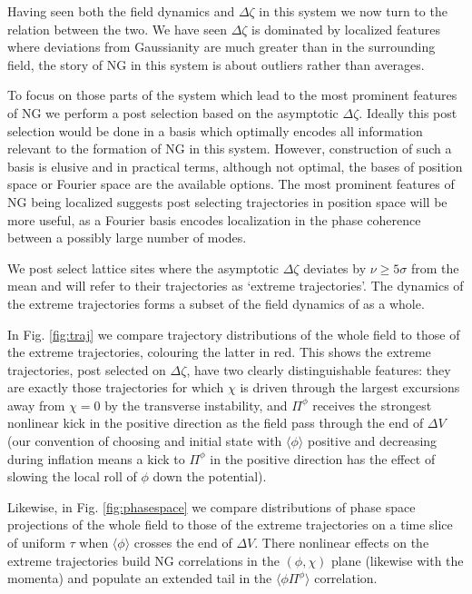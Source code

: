 Having seen both the field dynamics and $\Delta\zeta$ in this system we now turn to the relation between the two.
We have seen $\Delta\zeta$ is dominated by localized features where deviations from Gaussianity are much greater than in the surrounding field, the story of NG in this system is about outliers rather than averages.

To focus on those parts of the system which lead to the most prominent features of NG we perform a post selection based on the asymptotic $\Delta\zeta$.
Ideally this post selection would be done in a basis which optimally encodes all information relevant to the formation of NG in this system.
However, construction of such a basis is elusive and in practical terms, although not optimal, the bases of position space or Fourier space are the available options. 
The most prominent features of NG being localized suggests post selecting trajectories in position space will be more useful, as a Fourier basis encodes localization in the phase coherence between a possibly large number of modes.

We post select lattice sites where the asymptotic $\Delta\zeta$ deviates by $\nu \ge 5 \sigma$ from the mean and will refer to their trajectories as `extreme trajectories'.
The dynamics of the extreme trajectories forms a subset of the field dynamics of as a whole.

In Fig. \ref{fig:traj} we compare trajectory distributions of the whole field to those of the extreme trajectories, colouring the latter in red. This shows the extreme trajectories, post selected on $\Delta\zeta$, have two clearly distinguishable features: they are exactly those trajectories for which $\chi$ is driven through the largest excursions away from $\chi=0$ by the transverse instability, and $\Pi^\phi$ receives the strongest nonlinear kick in the positive direction as the field pass through the end of $\Delta V$ (our convention of choosing and initial state with $\langle\phi\rangle$ positive and decreasing during inflation means a kick to $\Pi^\phi$ in the positive direction has the effect of slowing the local roll of $\phi$ down the potential).

Likewise, in Fig. \ref{fig:phasespace} we compare distributions of phase space projections of the whole field to those of the extreme trajectories on a time slice of uniform $\tau$ when $\langle\phi\rangle$ crosses the end of $\Delta V$. There nonlinear effects on the extreme trajectories build NG correlations in the $(\phi,\chi)$ plane (likewise with the momenta) and populate an extended tail in the $\langle\phi\Pi^\phi\rangle$ correlation.


